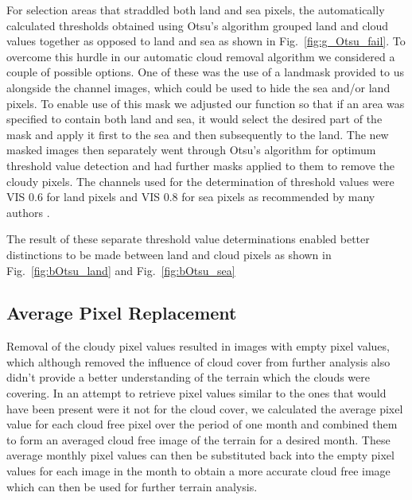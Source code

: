 For selection areas that straddled both land and sea pixels, the automatically calculated thresholds obtained using Otsu's algorithm grouped land and cloud values together as opposed to land and sea as shown in Fig.~\ref{fig:g_Otsu_fail}. %
To overcome this hurdle in our automatic cloud removal algorithm we considered a couple of possible options. One of these was the use of a landmask provided to us alongside the channel images, which could be used to hide the sea and/or land pixels. To enable use of this mask we adjusted our function so that if an area was specified to contain both land and sea, it would select the desired part of the mask and apply it first to the sea and then subsequently to the land. The new masked images then separately went through Otsu's algorithm for optimum threshold value detection and had further masks applied to them to remove the cloudy pixels. The channels used for the determination of threshold values were VIS 0.6 for land pixels and VIS 0.8 for sea pixels as recommended by many authors \cite{batlles2014cloud}. 

The result of these separate threshold value determinations enabled better distinctions to be made between land and cloud pixels as shown in Fig.~\ref{fig:bOtsu_land} and Fig.~\ref{fig:bOtsu_sea}

\subsection{Average Pixel Replacement}

Removal of the cloudy pixel values resulted in images with empty pixel values, which although removed the influence of cloud cover from further analysis also didn't provide a better understanding of the terrain which the clouds were covering. In an attempt to retrieve pixel values similar to the ones that would have been present were it not for the cloud cover, we calculated the average pixel value for each cloud free pixel over the period of one month and combined them to form an averaged cloud free image of the terrain for a desired month. These average monthly pixel values can then be substituted back into the empty pixel values for each image in the month to obtain a more accurate cloud free image which can then be used for further terrain analysis.

